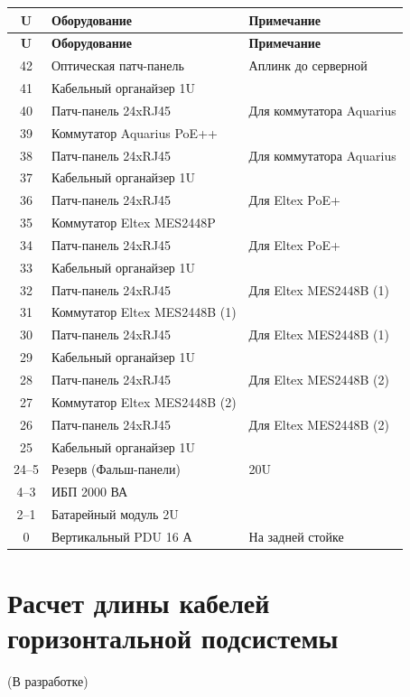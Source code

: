 \documentclass{bmstu}
\begin{document}
\begin{small}
\begin{longtable}{|c|l|l|}
\hline
\textbf{U} & \textbf{Оборудование} & \textbf{Примечание} \\ \hline
\endfirsthead
\hline
\textbf{U} & \textbf{Оборудование} & \textbf{Примечание} \\ \hline
\endhead
42 & Оптическая патч-панель & Аплинк до серверной \\ \hline
41 & Кабельный органайзер 1U & \\ \hline
40 & Патч-панель 24xRJ45 & Для коммутатора Aquarius \\ \hline
39 & Коммутатор Aquarius PoE++ & \\ \hline
38 & Патч-панель 24xRJ45 & Для коммутатора Aquarius \\ \hline
37 & Кабельный органайзер 1U & \\ \hline
36 & Патч-панель 24xRJ45 & Для Eltex PoE+ \\ \hline
35 & Коммутатор Eltex MES2448P & \\ \hline
34 & Патч-панель 24xRJ45 & Для Eltex PoE+ \\ \hline
33 & Кабельный органайзер 1U & \\ \hline
32 & Патч-панель 24xRJ45 & Для Eltex MES2448B (1) \\ \hline
31 & Коммутатор Eltex MES2448B (1) & \\ \hline
30 & Патч-панель 24xRJ45 & Для Eltex MES2448B (1) \\ \hline
29 & Кабельный органайзер 1U & \\ \hline
28 & Патч-панель 24xRJ45 & Для Eltex MES2448B (2) \\ \hline
27 & Коммутатор Eltex MES2448B (2) & \\ \hline
26 & Патч-панель 24xRJ45 & Для Eltex MES2448B (2) \\ \hline
25 & Кабельный органайзер 1U & \\ \hline
24--5 & Резерв (Фальш-панели) & 20U \\ \hline
4--3 & ИБП 2000 ВА & \\ \hline
2--1 & Батарейный модуль 2U & \\ \hline
0 & Вертикальный PDU 16 А & На задней стойке \\ \hline
\end{longtable}
\end{small}

\chapter{Расчет длины кабелей горизонтальной подсистемы}
(В разработке)
\end{document}
